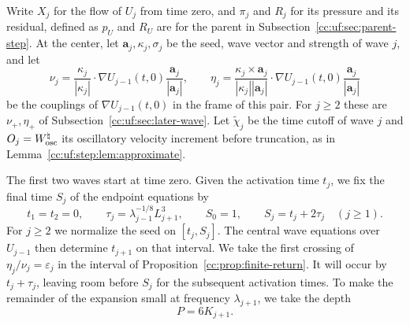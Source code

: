 Write $X_j$ for the flow of $U_j$ from time zero, and $\pi_j$ and $R_j$
for its pressure and its residual, defined as $p_U$ and $R_U$ are for
the parent in Subsection~\ref{cc:uf:sec:parent-step}.
At the center, let $\mathbf a_j,\kappa_j,\sigma_j$ be the seed,
wave vector and strength of wave $j$, and let
\begin{equation}\label{cc:uf:tower:eq:couplings}
 \nu_j=\frac{\kappa_j}{|\kappa_j|}\cdot\nabla U_{j-1}(t,0)
        \frac{\mathbf a_j}{|\mathbf a_j|},\qquad
 \eta_j=\frac{\kappa_j\times\mathbf a_j}{|\kappa_j||\mathbf a_j|}
        \cdot\nabla U_{j-1}(t,0)\frac{\mathbf a_j}{|\mathbf a_j|}
\end{equation}
be the couplings of $\nabla U_{j-1}(t,0)$ in the frame of this pair.
For $j\ge2$ these are $\nu_+,\eta_+$ of Subsection~\ref{cc:uf:sec:later-wave}.
Let $\widetilde\chi_j$ be the time cutoff of wave $j$ and
$O_j=W_{\rm osc}^\natural$ its oscillatory velocity increment before
truncation, as in Lemma~\ref{cc:uf:step:lem:approximate}.

The first two waves start at time zero. Given the activation time $t_j$,
we fix the final time $S_j$ of the endpoint equations by
\[
 t_1=t_2=0,\qquad
 \tau_j=\lambda_{j-1}^{-1/8}L_{j+1}^3,\qquad
 S_0=1,\qquad S_j=t_j+2\tau_j\quad(j\ge1).
\]
For $j\ge2$ we normalize the seed on $[t_j,S_j]$. The central wave
equations over $U_{j-1}$ then determine $t_{j+1}$ on that interval.
We take the first crossing
of $\eta_j/\nu_j=\varepsilon_j$ in the interval of
Proposition~\ref{cc:prop:finite-return}. It will occur by $t_j+\tau_j$,
leaving room before $S_j$ for the subsequent activation times.
To make the remainder of the expansion small at frequency $\lambda_{j+1}$,
we take the depth
\begin{equation}\label{cc:uf:tower:eq:step-orders}
 P=6K_{j+1}.
\end{equation}

